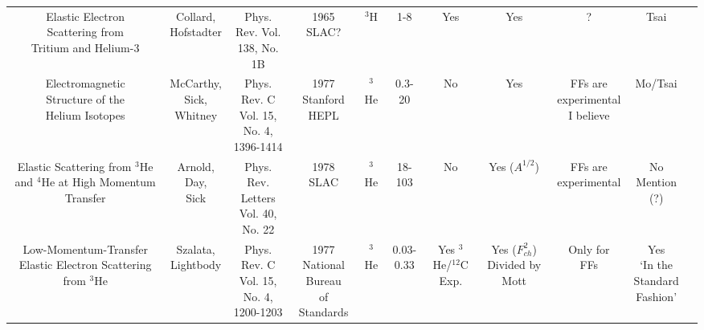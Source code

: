 \begin{landscape}
\begin{longtable}{c c c c c c c c c c c}
\thead{Elastic Electron \\ Scattering from \\Tritium and Helium-3} & \makecell{Collard,\\ Hofstadter} & \makecell{Phys. Rev. Vol.\\ 138, No. 1B} & \makecell{1965\\SLAC?} & $^3$H & 1-8 & Yes & Yes & ? & Tsai \\

\thead{Electromagnetic \\Structure of the \\Helium Isotopes} & \makecell{McCarthy,\\ Sick,\\ Whitney} & \makecell{Phys. Rev. C\\ Vol. 15, No. 4,\\1396-1414} & \makecell{1977\\ Stanford HEPL} & $^3$He & 0.3-20 & No & Yes & \makecell{FFs are\\ experimental\\ I believe} & Mo/Tsai \\

\thead{Elastic Scattering\\ from $^3$He and $^4$He at\\ High Momentum Transfer} & \makecell{Arnold,\\ Day,\\ Sick} & \makecell{Phys. Rev. Letters\\ Vol. 40, No. 22} & \makecell{1978\\SLAC} & $^3$He & 18-103 & No & \makecell{Yes \\($A^{1/2}$)} & \makecell{FFs are\\ experimental} & \makecell{No Mention\\ (?)} \\

\thead{Low-Momentum-Transfer\\ Elastic Electron\\ Scattering from $^3$He} & \makecell{Szalata,\\Lightbody} & \makecell{Phys. Rev. C\\ Vol. 15, No. 4,\\1200-1203} & \makecell{1977\\National Bureau\\ of Standards} & $^3$He & 0.03-0.33 & \makecell{Yes\\$^3$He/$^{12}$C\\Exp.} & \makecell{Yes \\($F_{ch}^2$)\\Divided\\ by Mott} & \makecell{Only for\\FFs} & \makecell{Yes\\ `In the\\Standard\\Fashion'}\\


\end{longtable}
\end{landscape}
